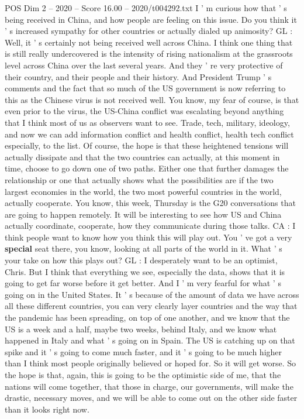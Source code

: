 \begin{textsample}{POS Dim 2 – 2020 – Score 16.00 – 2020/t004292.txt}
I ' m curious how that ' s being received in China, and how people are feeling on this issue.
Do you think it ' s increased sympathy for other countries or actually dialed up animosity?
GL : Well, it ' s certainly not being received well across China.
I think one thing that is still really undercovered is the intensity of rising nationalism at the grassroots level across China over the last several years.
And they ' re very protective of their country, and their people and their history.
And President Trump ' s comments and the fact that so much of the US government is now referring to this as the Chinese virus is not received well.
You know, my fear of course, is that even prior to the virus, the US-China conflict was escalating beyond anything that I think most of us as observers want to see.
Trade, tech, military, ideology, and now we can add information conflict and health conflict, health tech conflict especially, to the list.
Of course, the hope is that these heightened tensions will actually dissipate and that the two countries can actually, at this moment in time, choose to go down one of two paths.
Either one that further damages the relationship or one that actually shows what the possibilities are if the two largest economies in the world, the two most powerful countries in the world, actually cooperate.
You know, this week, Thursday is the G20 conversations that are going to happen remotely.
It will be interesting to see how US and China actually coordinate, cooperate, how they communicate during those talks.
CA : I think people want to know how you think this will play out.
You ' ve got a very \textbf{special} seat there, you know, looking at all parts of the world in it.
What ' s your take on how this plays out?
GL : I desperately want to be an optimist, Chris.
But I think that everything we see, especially the data, shows that it is going to get far worse before it get better.
And I ' m very fearful for what ' s going on in the United States.
It ' s because of the amount of data we have across all these different countries, you can very clearly layer countries and the way that the pandemic has been spreading, on top of one another, and we know that the US is a week and a half, maybe two weeks, behind Italy, and we know what happened in Italy and what ' s going on in Spain.
The US is catching up on that spike and it ' s going to come much faster, and it ' s going to be much higher than I think most people originally believed or hoped for.
So it will get worse.
So the hope is that, again, this is going to be the optimistic side of me, that the nations will come together, that those in charge, our governments, will make the drastic, necessary moves, and we will be able to come out on the other side faster than it looks right now.

\end{textsample}
